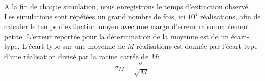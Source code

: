 \documentclass[openany,a4paper,12pt]{article}
\begin{document}
\par A la fin de chaque simulation, nous enregistrons le temps d'extinction observé. Les simulations sont répétées un grand nombre de fois, ici $10^4$ réalisations, afin de calculer le temps d'extinction moyen avec une marge d'erreur raisonnablement petite. L'erreur reportée pour la détermination de la moyenne est de un écart-type. L'écart-type sur une moyenne de $M$ réalisations est donnée par l'écart-type d'une réalisation divisé par la racine carrée de $M$:
%
\begin{equation}\label{gillespie_err_moyenne}
	\sigma_M = \frac{\sigma}{\sqrt{M}}.
\end{equation}
%


		
\printbibliography
\end{document}
